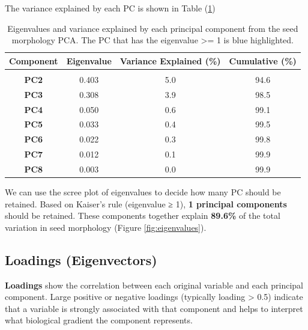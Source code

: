 \documentclass[
]{book}
\begin{document}
The variance explained by each PC is shown in Table (\ref{tab:variance-table})

\begin{table}
\centering
\caption{\label{tab:variance-table}Eigenvalues and variance explained by each principal component from the seed morphology PCA. The PC that has the eigenvalue >= 1 is blue highlighted.}
\centering
\begin{tabular}[t]{>{}c|c|c|c}
\hline
Component & Eigenvalue & Variance Explained (\%) & Cumulative (\%)\\
\hline
\textbf{\cellcolor[HTML]{e8f4f8}{PC1}} & \cellcolor[HTML]{e8f4f8}{7.169} & \cellcolor[HTML]{e8f4f8}{89.6} & \cellcolor[HTML]{e8f4f8}{89.6}\\
\hline
\textbf{PC2} & 0.403 & 5.0 & 94.6\\
\hline
\textbf{PC3} & 0.308 & 3.9 & 98.5\\
\hline
\textbf{PC4} & 0.050 & 0.6 & 99.1\\
\hline
\textbf{PC5} & 0.033 & 0.4 & 99.5\\
\hline
\textbf{PC6} & 0.022 & 0.3 & 99.8\\
\hline
\textbf{PC7} & 0.012 & 0.1 & 99.9\\
\hline
\textbf{PC8} & 0.003 & 0.0 & 99.9\\
\hline
\end{tabular}
\end{table}

We can use the scree plot of eigenvalues to decide how many PC should be retained. Based on Kaiser's rule (eigenvalue ≥ 1), \textbf{1 principal components} should be retained. These components together explain \textbf{89.6\%} of the total variation in seed morphology (Figure \ref{fig:eigenvalues}).

\subsection{Loadings (Eigenvectors)}\label{loadings-eigenvectors}

\textbf{Loadings} show the correlation between each original variable and each principal component. Large positive or negative loadings (typically \textbar loading\textbar{} \textgreater{} 0.5) indicate that a variable is strongly associated with that component and helps to interpret what biological gradient the component represents.
\end{document}
